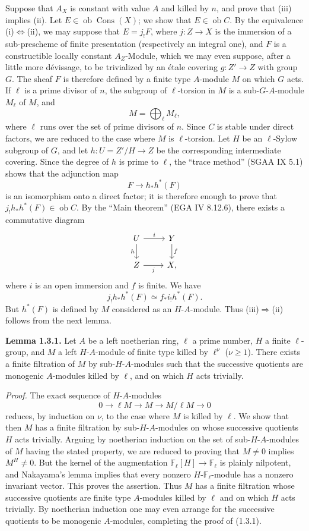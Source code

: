 \documentclass[11pt]{article}
\providecommand{\Cons}{\operatorname{Cons}}
\newcommand{\F}{\mathbb{F}}
\newcommand{\ob}{\operatorname{ob}}
\begin{document}
Suppose that $A_X$ is constant with value $A$ and killed by $n$, and prove that (iii) implies (ii). Let $E\in\ob\Cons(X)$; we show that $E\in\ob C$. By the equivalence (i)$\Leftrightarrow$(ii), we may suppose that $E=j_!F$, where $j:Z\to X$ is the immersion of a sub-prescheme of finite presentation (respectively an integral one), and $F$ is a constructible locally constant $A_Z$-Module, which we may even suppose, after a little more dévissage, to be trivialized by an étale covering $g:Z'\to Z$ with group $G$. The sheaf $F$ is therefore defined by a finite type $A$-module $M$ on which $G$ acts. If $\ell$ is a prime divisor of $n$, the subgroup of $\ell$-torsion in $M$ is a sub-$G$-$A$-module $M_\ell$ of $M$, and
\[
        M=\bigoplus_\ell M_\ell,
\]
where $\ell$ runs over the set of prime divisors of $n$. Since $C$ is stable under direct factors, we are reduced to the case where $M$ is $\ell$-torsion. Let $H$ be an $\ell$-Sylow subgroup of $G$, and let $h:U=Z'/H\to Z$ be the corresponding intermediate covering. Since the degree of $h$ is prime to $\ell$, the ``trace method'' (SGAA IX 5.1) shows that the adjunction map
\[
        F\longrightarrow h_*h^*(F)
\]
is an isomorphism onto a direct factor; it is therefore enough to prove that $j_!h_*h^*(F)\in\ob C$. By the ``Main theorem'' (EGA IV 8.12.6), there exists a commutative diagram
\[
\begin{tikzcd}
U \arrow[r,"i"] \arrow[d,"h"'] & Y \arrow[d,"f"]\\
Z \arrow[r,"j"'] & X,
\end{tikzcd}
\]
where $i$ is an open immersion and $f$ is finite. We have
\[
        j_!h_*h^*(F) \simeq f_* i_! h^*(F).
\]
But $h^*(F)$ is defined by $M$ considered as an $H$-$A$-module. Thus (iii)$\Rightarrow$(ii) follows from the next lemma.

\textbf{Lemma 1.3.1.} Let $A$ be a left noetherian ring, $\ell$ a prime number, $H$ a finite $\ell$-group, and $M$ a left $H$-$A$-module of finite type killed by $\ell^\nu$ ($\nu\geq1$). There exists a finite filtration of $M$ by sub-$H$-$A$-modules such that the successive quotients are monogenic $A$-modules killed by $\ell$, and on which $H$ acts trivially.

\emph{Proof.} The exact sequence of $H$-$A$-modules
\[
        0\longrightarrow \ell M\longrightarrow M\longrightarrow M/\ell M\longrightarrow 0
\]
reduces, by induction on $\nu$, to the case where $M$ is killed by $\ell$. We show that then $M$ has a finite filtration by sub-$H$-$A$-modules on whose successive quotients $H$ acts trivially. Arguing by noetherian induction on the set of sub-$H$-$A$-modules of $M$ having the stated property, we are reduced to proving that $M\neq0$ implies $M^H\neq0$. But the kernel of the augmentation $\F_\ell[H]\to\F_\ell$ is plainly nilpotent, and Nakayama's lemma implies that every nonzero $H$-$\F_\ell$-module has a nonzero invariant vector. This proves the assertion. Thus $M$ has a finite filtration whose successive quotients are finite type $A$-modules killed by $\ell$ and on which $H$ acts trivially. By noetherian induction one may even arrange for the successive quotients to be monogenic $A$-modules, completing the proof of (1.3.1).
\end{document}
